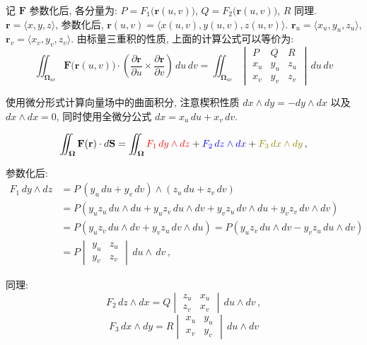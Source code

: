 \documentclass[UTF8]{ctexart}
\newcommand{\ve}[1]{\boldsymbol{\mathbf{#1}}}
\begin{document}
记 $ \ve{F} $ 参数化后, 各分量为: $ P = F_1 \big( \ve{r}(u, v) \big) $, $ Q = F_2 \big( \ve{r}(u, v) \big) $, $ R $ 同理. $ \ve{r} = \langle x, y, z \rangle $, 参数化后, $ \ve{r}(u, v) = \langle x(u, v), y(u, v), z(u, v) \rangle $. $ \ve{r}_u = \langle x_u, y_u, z_u \rangle $, $ \ve{r}_v = \langle x_v, y_v, z_v \rangle $. 由标量三重积的性质, 上面的计算公式可以等价为:
\[ \iint_{\ve{\Omega}_{uv}} \ve{F} \big( \ve{r} (u, v) \big) \cdot \left( \dfrac{\partial \ve{r}}{\partial u} \times \dfrac{\partial \ve{r}}{\partial v} \right) \,du\,dv = \iint_{\ve{\Omega}_{uv}} \begin{vmatrix}
    P & Q & R \\
    x_u & y_u & z_u \\
    x_v & y_v & z_v
\end{vmatrix} \,du\,dv \tag{$ * $}\]

使用微分形式计算向量场中的曲面积分, 注意楔积性质 $ dx \land dy = - dy \land dx $ 以及 $ dx \land dx = 0 $, 同时使用全微分公式 $ dx = x_u\,du + x_v \,dv $. 
\begin{thmbox}
    \[ \iint_{\ve{\Omega}} \ve{F} (\ve{r}) \cdot d\ve{S} = \iint_{\ve{\Omega}} {\color{red} F_1 \,dy\land dz} + {\color{blue} F_2 \,dz \land dx} + {\color{olive} F_3 \,dx \land dy} \,,\]
\end{thmbox}

参数化后:
\begin{align*}
    F_1 \,dy \land dz &= P \, (y_u \,du + y_v \,dv) \land (z_u \,du + z_v \, dv) \\
    &= P (y_u z_u \,du \land du + y_u z_v \,du\land dv + y_v z_u \, dv \land du + y_v z_v \,dv \land dv ) \\
    &= P (y_u z_v \,du \land dv + y_v z_u \,dv \land du) 
    = P (y_u z_v \,du \land dv - y_v z_u \,du \land dv) \\
    &= P \begin{vmatrix}
        y_u & z_u \\
        y_v & z_v 
    \end{vmatrix} \,du \land \,dv \,,
\end{align*}

同理: 
\[ F_2 \, dz \land dx = Q \begin{vmatrix}
    z_u & x_u \\
    z_v & x_v
\end{vmatrix} \, du \land dv \,,\]
\[ F_3 \,dx \land dy = R \begin{vmatrix}
    x_u & y_u \\
    x_v & y_v
\end{vmatrix} \, du \land dv \]
\end{document}
